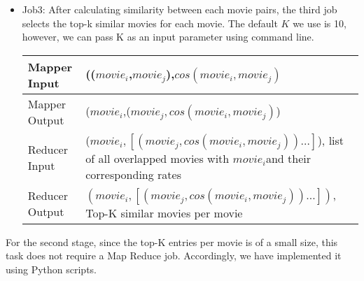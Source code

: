 \begin{itemize}
\item Job3: After calculating similarity between each movie pairs, the
  third job selects the top-k similar movies for each movie. The
  default $K$ we use is 10, however, we can pass K as an input
  parameter using command line.

  \begin{tabular}{|l|p{10cm}|}
    \hline
    Mapper Input & (($movie_i$,$movie_j$),$cos(movie_i,movie_j)$\\
    \hline
    Mapper Output & ($movie_i$,($movie_j,cos(movie_i,movie_j)$)\\
    \hline
    Reducer Input & ($movie_i,[(movie_j,cos(movie_i,movie_j))\ldots]$), list of all overlapped movies with $movie_i$and their corresponding rates\\
    \hline
    Reducer Output & $(movie_i,[(movie_j,cos(movie_i,movie_j))\ldots])$, Top-K similar movies per movie \\
    \hline
  \end{tabular}
\end{itemize}

For the second stage, since the top-K entries per movie is of a small
size, this task does not require a Map Reduce job. Accordingly, we
have implemented it using Python scripts.
